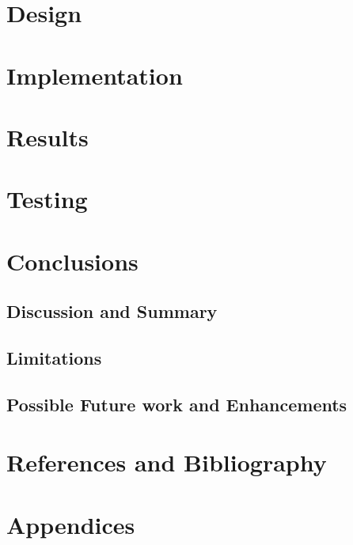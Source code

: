 \documentclass[12pt,a4paper,table]{article}
\begin{document}
    \section{Design}
    \section{Implementation}
    \section{Results}
    \section{Testing}
    \section{Conclusions}
        \subsection{Discussion and Summary}
        \subsection{Limitations}
        \subsection{Possible Future work and Enhancements}
    \section{References and Bibliography}
        
        
    \section{Appendices}
\end{document}
